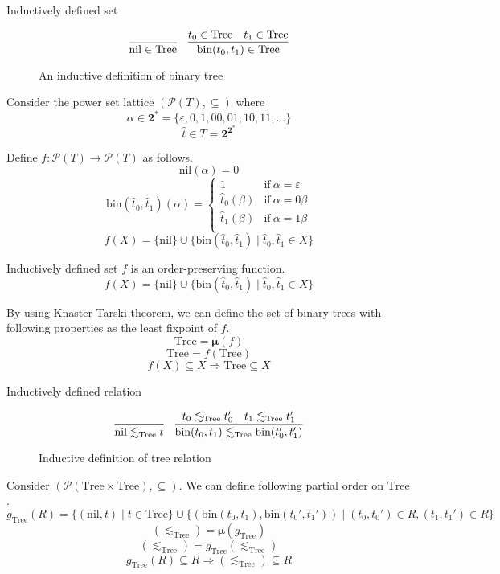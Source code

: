 \documentclass[9pt]{beamer}
\newcommand\pow[1]{\mathcal{P}(#1)}
\newcommand\two[0]{\mathbf{2}}
\newcommand\Tree[0]{\text{Tree}}
\newcommand\nil[0]{\text{nil}}
\newcommand\bin[0]{\text{bin}}
\newcommand\fix[0]{\boldsymbol{\mu}}
\begin{document}
\begin{frame}{Inductively defined set}
  \begin{figure}
  \[
    \infer
    {\nil \in \Tree}
    { }
    \quad
    \infer
    {\bin(t_0,t_1) \in \Tree}
    {t_0 \in \Tree & t_1 \in \Tree}
  \]
  \caption{An inductive definition of binary tree}
  \end{figure}

  \pause
  Consider the power set lattice $(\pow{T}, \subseteq)$ where
  $$\alpha \in \two^* = \{\varepsilon, 0, 1, 00, 01, 10, 11, ...\}$$
  $$\hat t \in T = \two^{\two^*}$$

  Define $f : \pow{T} \to \pow{T}$ as follows.
  $$ \nil(\alpha) = 0 $$
  $$\bin(\hat t_0, \hat t_1)(\alpha) = \begin{cases}
    1               & \text{if} \ \alpha = \varepsilon \\
    \hat t_0(\beta) & \text{if} \ \alpha = 0\beta \\
    \hat t_1(\beta) & \text{if} \ \alpha = 1\beta \\
    \end{cases}
  $$
  $$ f(X) = \{\nil\} \cup \{\bin(\hat t_0,\hat t_1) \mid \hat t_0, \hat t_1 \in X\} $$
\end{frame}

\begin{frame}{Inductively defined set}
  $f$ is an order-preserving function.
  $$ f(X) = \{\nil\} \cup \{\bin(\hat t_0, \hat t_1) \mid \hat t_0, \hat t_1 \in X\} $$

  By using Knaster-Tarski theorem, we can define the set of binary trees with following properties
  as the least fixpoint of $f$.
  $$ \Tree = \fix(f) $$
  $$ \Tree = f(\Tree) $$
  $$ f(X) \subseteq X \Rightarrow \Tree \subseteq X $$
\end{frame}

\begin{frame}{Inductively defined relation}
  \begin{figure}
  \[
    \infer
    {\nil \lesssim_{\Tree} t}
    {}
    \quad
    \infer
    {\bin(t_0,t_1) \lesssim_{\Tree} \bin(t_0',t_1')}
    {t_0 \lesssim_{\Tree} t_0' & t_1 \lesssim_{\Tree} t_1'}
  \]
  \caption{Inductive definition of tree relation}
  \end{figure}

  Consider $(\pow{\Tree \times \Tree}, \subseteq)$.
  We can define following partial order on $\Tree$.
  $$ g_{\Tree}(R) =
    \{(\nil,t) \mid t \in \Tree\} \cup
    \{(\bin(t_0, t_1), \bin(t_0', t_1')) \mid (t_0, t_0') \in R, (t_1, t_1') \in R \}
  $$
  $$ (\lesssim_{\Tree}) = \fix(g_{\Tree}) $$
  $$ (\lesssim_{\Tree}) = g_{\Tree}(\lesssim_{\Tree}) $$
  $$ g_{\Tree}(R) \subseteq R \Rightarrow (\lesssim_{\Tree}) \subseteq R $$
\end{frame}
\end{document}
